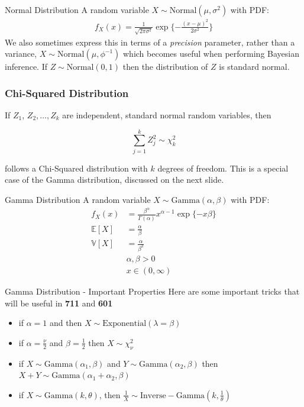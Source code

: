 \documentclass{beamer}
\begin{document}
\begin{frame}{Normal Distribution}
A random variable $X\sim\mathrm{Normal}(\mu, \sigma^{2})$ with PDF:
\begin{align*}
f_{X}(x) = \frac{1}{\sqrt{2\pi\sigma^{2}}}\exp\{-\frac{(x-\mu)^{2}}{2\sigma^{2}}\}
\end{align*}
We also sometimes express this in terms of a \emph{precision} parameter, rather than a variance, $X\sim\mathrm{Normal}(\mu, \phi^{-1})$ which becomes useful when performing Bayesian inference.  If $Z \sim \mathrm{Normal}(0, 1)$ then the distribution of $Z$ is standard normal.\\
\end{frame}

\begin{frame}
\frametitle{Chi-Squared Distribution}
If $Z_1$, $Z_2, \hdots, Z_k$ are independent, standard normal random variables, then 

$$\sum_{j = 1}^k Z_j^2 \sim \chi^2_k$$

follows a Chi-Squared distribution with $k$ degrees of freedom.  This is a special case of the Gamma distribution, discussed on the next slide.  


\end{frame}

\begin{frame}{Gamma Distribution}
A random variable $X\sim\mathrm{Gamma}(\alpha, \beta)$ with PDF:
\begin{align*}
f_{X}(x) &= \frac{\beta^{\alpha}}{\Gamma(\alpha)}x^{\alpha-1}\exp\{-x\beta\} \\
\mathbb{E}[X] &= \frac{\alpha}{\beta} \\
\mathbb{V}[X] &= \frac{\alpha}{\beta^{2}} \\
&\alpha, \beta > 0 \\
&x \in (0, \infty)
\end{align*} 
\end{frame}

\begin{frame}{Gamma Distribution  - Important Properties}
Here are some important tricks that will be useful in \textbf{711} and \textbf{601}
\begin{itemize}
\item{if $\alpha = 1$ and then $X\sim\mathrm{Exponential}(\lambda = \beta)$}
\item{if $\alpha = \frac{\nu}{2}$ and $\beta = \frac{1}{2}$ then $X\sim\chi^{2}_{\nu}$}
\item{if $X\sim\mathrm{Gamma}(\alpha_{1}, \beta)$ and $Y\sim\mathrm{Gamma}(\alpha_{2}, \beta)$ then $X+Y\sim\mathrm{Gamma}(\alpha_{1}+\alpha_{2}, \beta)$}
\item{if $X\sim\mathrm{Gamma}(k, \theta)$, then $\frac{1}{X}\sim\mathrm{Inverse-Gamma}(k, \frac{1}{\theta})$}
\end{itemize}
\end{frame}
\end{document}
